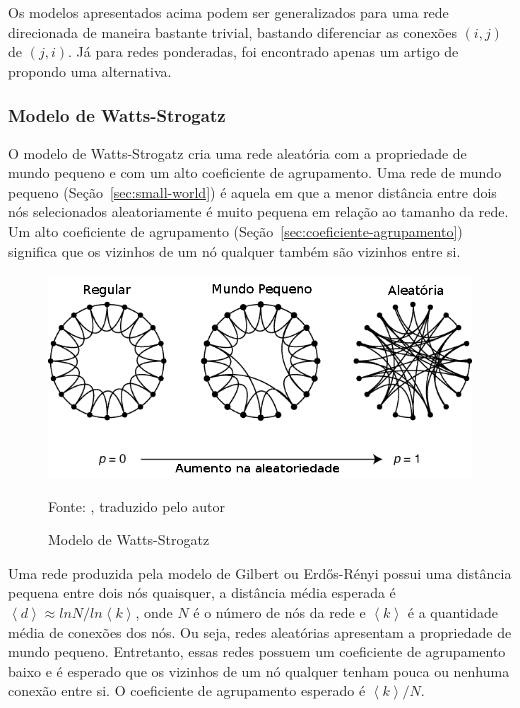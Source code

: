 \documentclass[12pt,a4paper,final]{article}
\newcommand{\avg}[1]{\left\langle #1 \right\rangle} %
\newcommand{\source}[1]{\vspace{-10pt} \caption*{Fonte: {#1}} }
\begin{document}
Os modelos apresentados acima podem ser generalizados para uma rede direcionada de maneira bastante trivial, bastando diferenciar as conexões $(i, j)$ de $(j, i)$. Já para redes ponderadas, foi encontrado apenas um artigo de  propondo uma alternativa.

\subsubsection{Modelo de Watts-Strogatz}

O modelo de Watts-Strogatz cria uma rede aleatória com a propriedade de mundo pequeno e com um alto coeficiente de agrupamento. Uma rede de mundo pequeno (Seção~\ref{sec:small-world}) é aquela em que a menor distância entre dois nós selecionados aleatoriamente é muito pequena em relação ao tamanho da rede. Um alto coeficiente de agrupamento (Seção~\ref{sec:coeficiente-agrupamento}) significa que os vizinhos de um nó qualquer também são vizinhos entre si.

\begin{figure}[ht]
    \centering
    \includegraphics[scale=0.6]{small-world.png}
    \caption{Modelo de Watts-Strogatz}
    \source{, traduzido pelo autor}
\end{figure}    

Uma rede produzida pela modelo de Gilbert ou Erdős-Rényi possui uma distância pequena entre dois nós quaisquer, a distância média esperada é $\avg{d} \approx ln N / ln \avg{k}$, onde $N$ é o número de nós da rede e $\avg{k}$ é a quantidade média de conexões dos nós. Ou seja, redes aleatórias apresentam a propriedade de mundo pequeno. Entretanto, essas redes possuem um coeficiente de agrupamento baixo e é esperado que os vizinhos de um nó qualquer tenham pouca ou nenhuma conexão entre si. O coeficiente de agrupamento esperado é $\avg{k}/N$.
\end{document}
